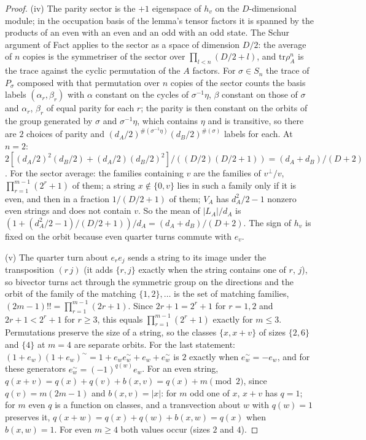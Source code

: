 \begin{proof}
(iv) The parity sector is the $+1$ eigenspace of $h_{v}$ on the $D$-dimensional module; in the occupation basis of the lemma's tensor factors it is spanned by the products of an even with an even and an odd with an odd state. The Schur argument of Fact  applies to the sector as a space of dimension $D/2$: the average of $n$ copies is the symmetriser of the sector over $\prod_{l<n}(D/2 + l)$, and $\mathrm{tr}\rho_{A}^{n}$ is the trace against the cyclic permutation of the $A$ factors. For $\sigma \in S_{n}$ the trace of $P_{\sigma}$ composed with that permutation over $n$ copies of the sector counts the basis labels $(\alpha_{r}, \beta_{r})$ with $\alpha$ constant on the cycles of $\sigma^{-1}\eta$, $\beta$ constant on those of $\sigma$ and $\alpha_{r}$, $\beta_{r}$ of equal parity for each $r$; the parity is then constant on the orbits of the group generated by $\sigma$ and $\sigma^{-1}\eta$, which contains $\eta$ and is transitive, so there are $2$ choices of parity and $(d_{A}/2)^{\#(\sigma^{-1}\eta)}(d_{B}/2)^{\#(\sigma)}$ labels for each. At $n = 2$: $2[(d_{A}/2)^{2}(d_{B}/2) + (d_{A}/2)(d_{B}/2)^{2}]/((D/2)(D/2 + 1)) = (d_{A} + d_{B})/(D + 2)$. For the sector average: the families containing $v$ are the families of $v^{\perp}/v$, $\prod_{r=1}^{m-1}(2^{r} + 1)$ of them; a string $x \notin \{0, v\}$ lies in such a family only if it is even, and then in a fraction $1/(D/2 + 1)$ of them; $V_{A}$ has $d_{A}^{2}/2 - 1$ nonzero even strings and does not contain $v$. So the mean of $|L_{A}|/d_{A}$ is $(1 + (d_{A}^{2}/2 - 1)/(D/2 + 1))/d_{A} = (d_{A} + d_{B})/(D + 2)$. The sign of $h_{v}$ is fixed on the orbit because even quarter turns commute with $e_{v}$.

(v) The quarter turn about $e_{r}e_{j}$ sends a string to its image under the transposition $(r\,j)$ (it adds $\{r,j\}$ exactly when the string contains one of $r$, $j$), so bivector turns act through the symmetric group on the directions and the orbit of the family of the matching $\{1,2\},\dots$ is the set of matching families, $(2m - 1)!! = \prod_{r=1}^{m-1}(2r + 1)$. Since $2r + 1 = 2^{r} + 1$ for $r = 1, 2$ and $2r + 1 < 2^{r} + 1$ for $r \ge 3$, this equals $\prod_{r=1}^{m-1}(2^{r} + 1)$ exactly for $m \le 3$. Permutations preserve the size of a string, so the classes $\{x, x + v\}$ of sizes $\{2, 6\}$ and $\{4\}$ at $m = 4$ are separate orbits. For the last statement: $(1 + e_{w})(1 + e_{w})^{\sim} = 1 + e_{w}e_{w}^{\sim} + e_{w} + e_{w}^{\sim}$ is $2$ exactly when $e_{w}^{\sim} = -e_{w}$, and for these generators $e_{w}^{\sim} = (-1)^{q(w)}e_{w}$. For an even string, $q(x + v) = q(x) + q(v) + b(x, v) = q(x) + m \pmod 2$, since $q(v) = m(2m - 1)$ and $b(x, v) = |x|$: for $m$ odd one of $x$, $x + v$ has $q = 1$; for $m$ even $q$ is a function on classes, and a transvection about $w$ with $q(w) = 1$ preserves it, $q(x + w) = q(x) + q(w) + b(x, w) = q(x)$ when $b(x,w) = 1$. For even $m \ge 4$ both values occur (sizes $2$ and $4$).


\end{proof}
